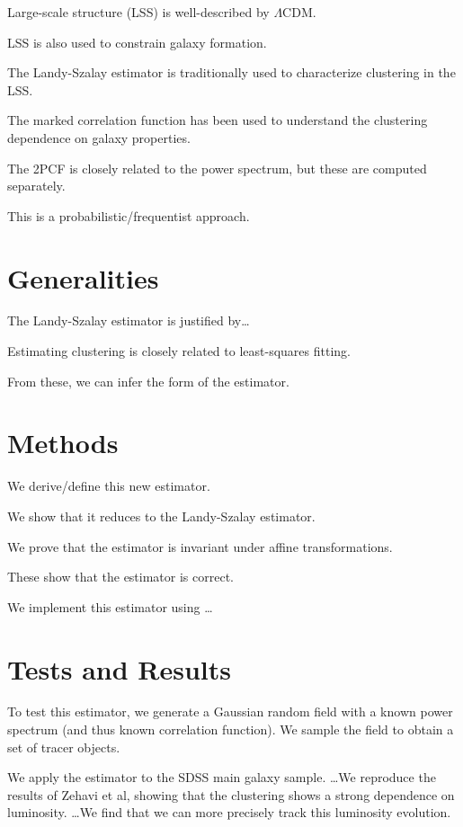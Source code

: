 \documentclass[modern]{aastex62}
\begin{document}
Large-scale structure (LSS) is well-described by $\Lambda$CDM. 

LSS is also used to constrain galaxy formation.

The Landy-Szalay estimator is traditionally used to characterize clustering in the LSS.

The marked correlation function has been used to understand the clustering dependence on galaxy properties.

The 2PCF is closely related to the power spectrum, but these are computed separately. 

This is a probabilistic/frequentist approach.

\section{Generalities}

The Landy-Szalay estimator is justified by\ldots

Estimating clustering is closely related to least-squares fitting.

From these, we can infer the form of the estimator.

\section{Methods}

We derive/define this new estimator.

We show that it reduces to the Landy-Szalay estimator.

We prove that the estimator is invariant under affine transformations.

These show that the estimator is correct.

We implement this estimator using \ldots

\section{Tests and Results}

To test this estimator, we generate a Gaussian random field with a known power spectrum (and thus known correlation function). We sample the field to obtain a set of tracer objects.

We apply the estimator to the SDSS main galaxy sample. \ldots We reproduce the results of Zehavi et al, showing that the clustering shows a strong dependence on luminosity. \ldots We find that we can more precisely track this luminosity evolution.
\end{document}
